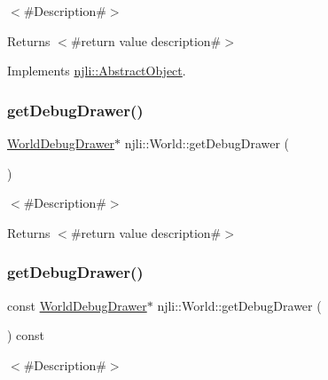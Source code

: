 $<$\#\+Description\#$>$

\begin{DoxyReturn}{Returns}
$<$\#return value description\#$>$ 
\end{DoxyReturn}


Implements \mbox{\hyperlink{classnjli_1_1_abstract_object_afdabb48c4bf763e297ffe810b433a863}{njli\+::\+Abstract\+Object}}.

\mbox{\label{classnjli_1_1_world_abd9b6751260b5e6c28fa9cfd874cfaad}} 
\subsubsection{\texorpdfstring{get\+Debug\+Drawer()}{getDebugDrawer()}\hspace{0.1cm}{\footnotesize\ttfamily [1/2]}}
{\footnotesize\ttfamily \mbox{\hyperlink{classnjli_1_1_world_debug_drawer}{World\+Debug\+Drawer}}$\ast$ njli\+::\+World\+::get\+Debug\+Drawer (\begin{DoxyParamCaption}{ }\end{DoxyParamCaption})}

$<$\#\+Description\#$>$

\begin{DoxyReturn}{Returns}
$<$\#return value description\#$>$ 
\end{DoxyReturn}
\mbox{\label{classnjli_1_1_world_a88ce760cdc314298a58f96af3ef9d492}} 
\subsubsection{\texorpdfstring{get\+Debug\+Drawer()}{getDebugDrawer()}\hspace{0.1cm}{\footnotesize\ttfamily [2/2]}}
{\footnotesize\ttfamily const \mbox{\hyperlink{classnjli_1_1_world_debug_drawer}{World\+Debug\+Drawer}}$\ast$ njli\+::\+World\+::get\+Debug\+Drawer (\begin{DoxyParamCaption}{ }\end{DoxyParamCaption}) const}

$<$\#\+Description\#$>$

